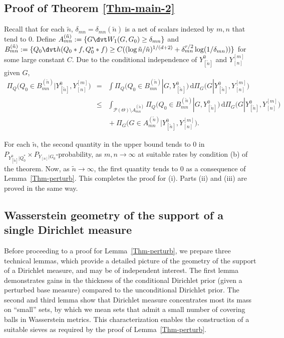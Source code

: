 \documentclass[MSNbibl,number,citesort]{arxbj}
\newcommand{\Pcal}{\mathscr{P}}
\newcommand{\YYn}{Y_{[n]}}
\newcommand{\delmn}{\delta_{mn}}
\newcommand{\nn}{\tilde{n}}
\begin{document}
\subsection{Proof of Theorem \texorpdfstring{\protect\ref{Thm-main-2}}{2.3}}
Recall that for each $\nn$, $\delmn= \delmn(\nn)$ is a net of scalars
indexed by $m,n$ that tend to 0.
Define $A_{mn}^{(\nn)}:= \{G\dvt W_1(G,G_0) \geq\delmn\}$ and
$B_{mn}^{(\nn)}:= \{Q_0\dvt h(Q_0*f,Q_0^**f) \geq C ((\log\nn/\nn
)^{1/(d+2)}
+ \delmn^{r/2}\log(1/\delmn))\}$
for some large constant $C$.
Due to the conditional independence of $Y_{[\nn]}^0$ and $\YYn^{[m]}$
given $G$,
%
\begin{eqnarray*}
 \Pi_Q \bigl(Q_0 \in B_{mn}^{(\nn)}|
Y_{[\nn]}^0, \YYn^{[m]} \bigr) &=& \int
\Pi_Q \bigl(Q_0 \in B_{mn}^{(\nn)} |
G, Y_{[\nn]}^0 \bigr) \,\mathrm{d}\Pi_G \bigl(G|
Y_{[\nn]}^0, \YYn^{[m]} \bigr)
\\
&\leq& \int_{\Pcal(\Theta)\setminus A_{mn}^{(\nn)}} \Pi_Q \bigl(Q_0
\in B_{mn}^{(\nn)} | G, Y_{[\nn]}^0 \bigr)
\,\mathrm{d}\Pi_G \bigl(G| Y_{[\nn]}^0,
\YYn^{[m]} \bigr)
\\
&&{} + \Pi_G \bigl(G \in A_{mn}^{(\nn)} |
Y_{[\nn]}^0, \YYn^{[m]} \bigr).
\end{eqnarray*}

For each $\nn$, the second quantity in the upper bound tends to 0
in $P_{Y_{[\nn]}^0|Q_0^*}\times P_{\YYn|G_0}$-probability,
as $m, n\rightarrow\infty$ at suitable rates by
condition (b) of the theorem. Now, as $\nn\rightarrow\infty$,
the first quantity tends to 0
as a consequence of Lemma~\ref{Thm-perturb}. This completes the
proof for (i). Parts (ii) and (iii) are proved in the same way.

\subsection{Wasserstein geometry of the support of a single
Dirichlet measure}
\label{sec-geometry}

Before proceeding to a proof for Lemma~\ref{Thm-perturb}, we prepare
three technical lemmas, which provide
a detailed picture of the geometry of the support of a Dirichlet
measure, and may be of independent interest.
The first lemma demonstrates gains in the thickness of the conditional
Dirichlet prior (given a perturbed base measure) compared to the
unconditional Dirichlet prior. The second and third lemma show
that Dirichlet measure concentrates most its mass on ``small'' sets,
by which we mean sets that admit a small number of covering balls
in Wasserstein metrics. This characterization
enables the construction of a suitable sieves as required by the proof
of Lemma~\ref{Thm-perturb}.
\end{document}
